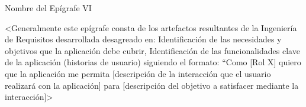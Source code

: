 \epigraph{Nombre del Epígrafe VI}{%
<Generalmente este epígrafe consta de los artefactos resultantes de la Ingeniería de Requisitos desarrollada desagreado en: Identificación de las necesidades y objetivos que la aplicación debe cubrir, Identificación de las funcionalidades clave de la aplicación (historias de usuario) siguiendo el formato: “Como [Rol X] quiero que la aplicación me permita [descripción de la interacción que el usuario realizará con la aplicación] para [descripción del objetivo a satisfacer mediante la interacción]>
}
